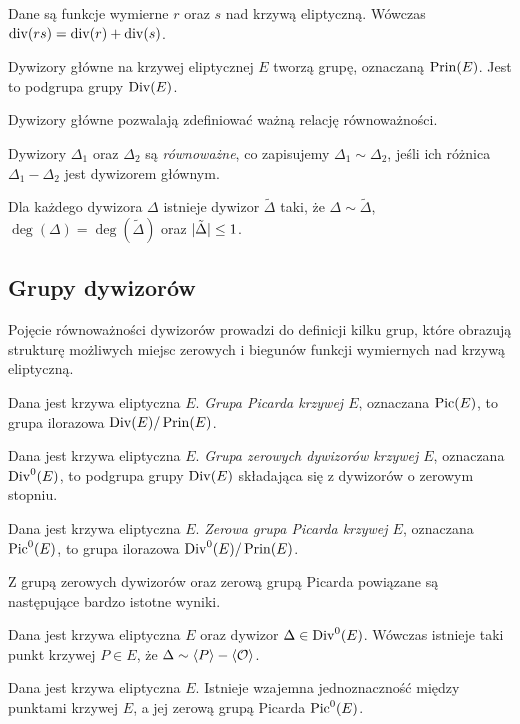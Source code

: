 \begin{theorem}
Dane są funkcje wymierne $r$ oraz $s$ nad krzywą eliptyczną.
Wówczas $\operatorname{div}(rs) = \operatorname{div}(r) + \operatorname{div}(s)$.
\end{theorem}

\begin{corollary}
Dywizory główne na krzywej eliptycznej $E$ tworzą grupę,
oznaczaną $\operatorname{Prin}(E)$.
Jest to podgrupa grupy $\operatorname{Div}(E)$.
\end{corollary}

Dywizory główne pozwalają zdefiniować ważną relację równoważności.

\begin{definition}
Dywizory $\Delta_1$ oraz $\Delta_2$ są \emph{równoważne},
co zapisujemy $\Delta_1 \sim \Delta_2$,
jeśli ich różnica $\Delta_1 - \Delta_2$ jest dywizorem głównym.
\end{definition}

\begin{lemma}\label{divisor_linear_reduction_lemma}
Dla każdego dywizora $\Delta$ istnieje dywizor $\tilde{\Delta}$ taki,
że $\Delta \sim \tilde{\Delta}$, $\deg(\Delta) = \deg(\tilde{\Delta})$
oraz $\lvert\tilde{\Delta}\rvert \leq 1$.
\end{lemma}

\subsection*{Grupy dywizorów}

Pojęcie równoważności dywizorów prowadzi do definicji kilku grup,
które obrazują strukturę
możliwych miejsc zerowych i biegunów funkcji wymiernych nad krzywą eliptyczną.

\begin{definition}
Dana jest krzywa eliptyczna $E$.
\emph{Grupa Picarda krzywej $E$},
oznaczana $\operatorname{Pic}(E)$,
to grupa ilorazowa $\operatorname{Div}(E)/\operatorname{Prin}(E)$.
\end{definition}

\begin{definition}
Dana jest krzywa eliptyczna $E$.
\emph{Grupa zerowych dywizorów krzywej $E$},
oznaczana $\operatorname{Div}^0(E)$,
to podgrupa grupy $\operatorname{Div}(E)$ składająca się
z dywizorów o zerowym stopniu.
\end{definition}

\begin{definition}
Dana jest krzywa eliptyczna $E$.
\emph{Zerowa grupa Picarda krzywej $E$},
oznaczana $\operatorname{Pic}^0(E)$,
to grupa ilorazowa $\operatorname{Div}^0(E)/\operatorname{Prin}(E)$.
\end{definition}

Z grupą zerowych dywizorów oraz zerową grupą Picarda
powiązane są następujące bardzo istotne wyniki.

\begin{theorem}
Dana jest krzywa eliptyczna $E$ oraz dywizor $\Delta \in \operatorname{Div}^0(E)$.
Wówczas istnieje taki punkt krzywej $P \in E$,
że $\Delta \sim \langle P\rangle - \langle\mathcal{O}\rangle$.
\end{theorem}

\begin{corollary}
Dana jest krzywa eliptyczna $E$.
Istnieje wzajemna jednoznaczność między punktami krzywej $E$,
a jej zerową grupą Picarda $\operatorname{Pic}^0(E)$.
\end{corollary}
